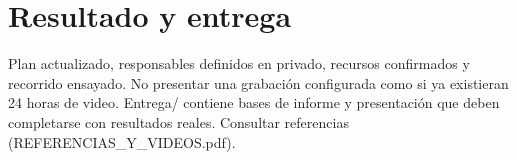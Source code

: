 \documentclass[12pt,a4paper]{article}
\begin{document}
\section*{Resultado y entrega}
Plan actualizado, responsables definidos en privado, recursos confirmados y recorrido ensayado. No presentar una grabación configurada como si ya existieran 24 horas de video. \textnormal{Entrega/\allowbreak{}} contiene bases de informe y presentación que deben completarse con resultados reales. Consultar referencias (REFERENCIAS\_Y\_VIDEOS.pdf).\par
\end{document}
